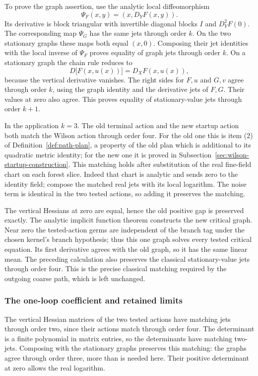 To prove the graph assertion, use the analytic local diffeomorphism
\[
                  \Psi_F(x,y)=(x,D_YF(x,y)).
\]
Its derivative is block triangular with invertible diagonal blocks
$I$ and $D_Y^2F(0)$. The corresponding map $\Psi_G$ has the same
jets through order $k$. On the two stationary graphs these maps
both equal $(x,0)$. Composing their jet identities with the local
inverse of $\Psi_F$ proves equality of graph jets through order
$k$. On a stationary graph the chain rule reduces to
\[
 D\bigl[F(x,u(x))\bigr]=D_XF(x,u(x)),
\]
because the vertical derivative vanishes. The right sides for
$F,u$ and $G,v$ agree through order $k$, using the graph identity
and the derivative jets of $F,G$. Their values at zero also agree.
This proves equality of stationary-value jets through order $k+1$.

In the application $k=3$. The old terminal action and the new
startup action both match the Wilson action through order four.
For the old one this is item (2) of Definition~\ref{def:path-plan},
a property of the old plan which is additional to its quadratic
metric identity; for the new one it is proved in
Subsection~\ref{sec:wilson-startup-construction}. This matching holds
after substitution of the real fine-field chart on each forest
slice. Indeed that chart is analytic and sends zero to the
identity field; compose the matched real jets with its local
logarithm. The noise term is identical in the two tested actions,
so adding it preserves the matching.

The vertical Hessians at zero are equal, hence the old positive
gap is preserved exactly. The analytic implicit function theorem
constructs the new critical graph. Near zero the tested-action
germs are independent of the branch tag under the chosen kernel's
branch hypothesis; thus this one graph solves every tested
critical equation. Its first derivative agrees with the old graph,
so it has the same linear mean. The preceding calculation also
preserves the classical stationary-value jets through order four.
This is the precise classical matching required by the outgoing
coarse path, which is left unchanged.

\subsubsection{The one-loop coefficient and retained limits}
The vertical Hessian matrices of the two tested actions have
matching jets through order two, since their actions match through
order four. The determinant is a finite polynomial in matrix
entries, so the determinants have matching two-jets. Composing
with the stationary graphs preserves this matching: the graphs
agree through order three, more than is needed here. Their
positive determinant at zero allows the real logarithm.


